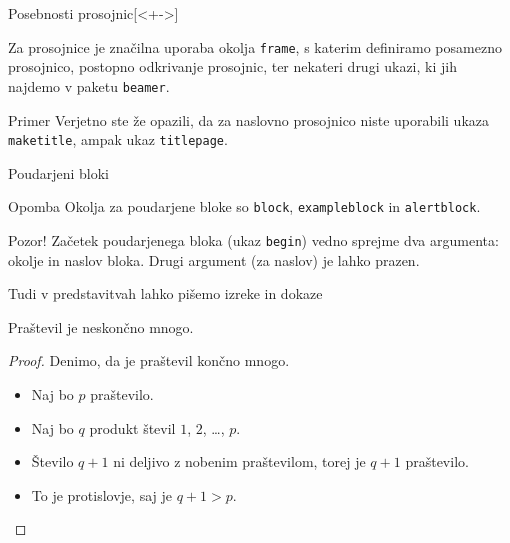 \begin{frame}{Posebnosti prosojnic}[<+->]

	Za prosojnice je značilna uporaba okolja \texttt{frame},
	s katerim definiramo posamezno prosojnico,
	postopno odkrivanje prosojnic,
	ter nekateri drugi ukazi, ki jih najdemo v paketu \texttt{beamer}.
	\begin{exampleblock}{Primer}
		Verjetno ste že opazili, da za naslovno prosojnico niste uporabili
		ukaza \texttt{maketitle}, ampak ukaz \texttt{titlepage}.
	\end{exampleblock}
\end{frame}

\begin{frame}{Poudarjeni bloki}
		\begin{block}{Opomba}
			Okolja za poudarjene bloke so \texttt{block}, \texttt{exampleblock} in \texttt{alertblock}.
		\end{block}
		\begin{alertblock}{Pozor!}
		 Začetek poudarjenega bloka (ukaz \texttt{begin}) vedno sprejme 
		 dva argumenta: okolje in naslov bloka.
		 Drugi argument (za naslov) je lahko prazen. 	
		\end{alertblock}
		

\end{frame}

\begin{frame}{Tudi v predstavitvah lahko pišemo izreke in dokaze}

	\begin{izrek}
	   Praštevil je neskončno mnogo.
	\end{izrek}
	\begin{proof}
	   Denimo, da je praštevil končno mnogo.
	   \begin{itemize}[<+->]
		  \item Naj bo \(p\)  praštevilo.
		  \item Naj bo \(q\) produkt števil \(1\), \(2\), \ldots, \(p\).
		  \item Število \(q+1\) ni deljivo z nobenim praštevilom, torej je \(q+1\) praštevilo.
		  \item To je protislovje, saj je \(q+1>p\). \qedhere
	   \end{itemize}
	\end{proof}
 \end{frame}
 
